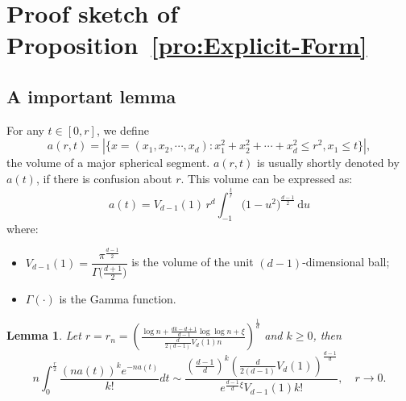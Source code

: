 \documentclass[preprint,12pt]{elsarticle}
\newtheorem{lemma}{Lemma}
\begin{document}
\section{Proof sketch of Proposition~\ref{pro:Explicit-Form}}\label{sec:Pro-1}

\subsection{A important lemma}


For any $t\in[0,r]$, we define
\begin{equation}\label{eq:a(r,t)}
  a(r,t)=|\{x=(x_1,x_2,\cdots,x_d):x_1^2+x_2^2+\cdots+x_d^2\leq r^2, x_1\leq t\}|,
\end{equation}
the volume of a major spherical segment.
 $a(r,t)$  is usually shortly denoted by $a(t)$, if there is   confusion about $r$.
This volume can be expressed as:
$$
a(t)
=V_{d-1}(1)\,r^d\int_{-1}^{\frac{t}{r}}\bigl(1-u^2\bigr)^{\frac{d-1}{2}}\,\mathrm{d}u
$$
where:
\begin{itemize}
	\item \(V_{d-1}(1)=\dfrac{\pi^{\tfrac{d-1}{2}}}{\Gamma\bigl(\tfrac{d+1}{2}\bigr)}\) is the volume of the unit \((d-1)\)-dimensional ball;
	\item \(\Gamma(\cdot)\) is the Gamma function.
\end{itemize}



 \begin{lemma}\label{lemma:a(t)}
 Let $r=r_n=\left( \frac{\log n+ \frac{dk-d+1}{d-1} \log\log n+\xi}{ \frac{d}{2(d-1)}V_d(1) n }\right)^{\frac1d}$ and $k\geq 0$, then
$$
    n\int_0^{\frac r2}\frac{(na(t))^ke^{-na(t)}}{k!}dt\sim
   \frac{\left(\frac{d-1}{d}\right)^k\left(\frac{d}{2(d-1)}V_d(1)\right)^{\frac{d-1}{d}}}{e^{\frac{d-1}{d}\xi}{V_{d-1}(1)}k!}, \quad r\rightarrow 0.
$$
\end{lemma}
\end{document}
